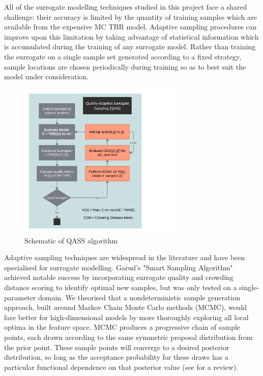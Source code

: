 All of the surrogate modelling techniques studied in this project face a shared
challenge: their accuracy is limited by the quantity of training samples which
are available from the expensive MC TBR model. Adaptive sampling procedures can
improve upon this limitation by taking advantage of statistical information
which is accumulated during the training of any surrogate model. Rather than
training the surrogate on a single sample set generated according to a fixed
strategy, sample locations are chosen periodically during training so as to best suit the model
under consideration.

\begin{figure}
	\centering
	\vspace{-3ex}
	\includegraphics[width=0.7\textwidth]{fig4_qassplan.png}
	\caption{Schematic of QASS algorithm}
	\label{fig:qassplan}
\end{figure}

Adaptive sampling techniques are widespread in the literature and have been
specialised for surrogate modelling. Garud's \cite{Garud2016} "Smart Sampling
Algorithm" achieved notable success by incorporating surrogate quality and
crowding distance scoring to identify optimal new samples, but was only tested
on a single-parameter domain. We theorised that a nondeterministic sample
generation approach, built around Markov Chain Monte Carlo methods (MCMC), would
fare better for high-dimensional models by more thoroughly exploring all local
optima in the feature space. MCMC produces a progressive chain of sample points,
each drawn according to the same symmetric proposal distribution
from the prior point. These sample points will converge to a desired posterior
distribution, so long as the acceptance probability for these draws has a
particular functional dependence on that posterior value (see \cite{Zhou2018}
for a review).

